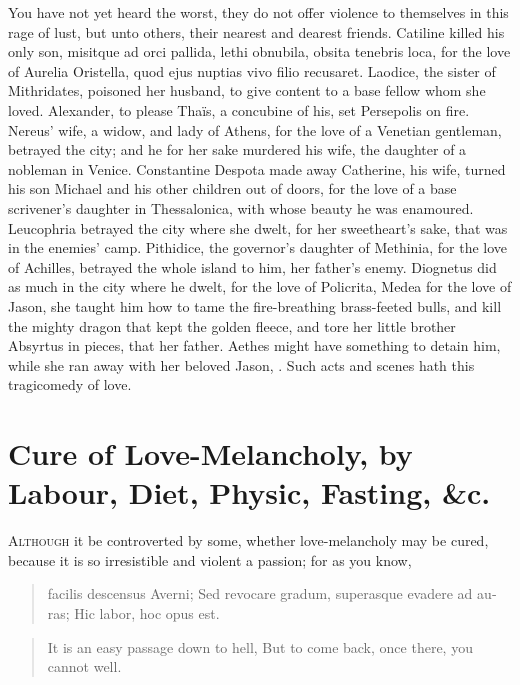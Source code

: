You have not yet heard the worst, they do not offer violence to
themselves in this rage of lust, but unto others, their nearest and
dearest friends. Catiline killed his only son, misitque ad orci
pallida, lethi obnubila, obsita tenebris loca, for the love of Aurelia
Oristella, quod ejus nuptias vivo filio recusaret. Laodice, the
sister of Mithridates, poisoned her husband, to give content to a base
fellow whom she loved. Alexander, to please Thaïs, a concubine of
his, set Persepolis on fire. Nereus' wife, a widow, and lady of
Athens, for the love of a Venetian gentleman, betrayed the city; and he
for her sake murdered his wife, the daughter of a nobleman in Venice.
Constantine Despota made away Catherine, his wife, turned his son
Michael and his other children out of doors, for the love of a base
scrivener's daughter in Thessalonica, with whose beauty he was
enamoured. Leucophria betrayed the city where she dwelt, for her
sweetheart's sake, that was in the enemies' camp. Pithidice, the
governor's daughter of Methinia, for the love of Achilles, betrayed the
whole island to him, her father's enemy. Diognetus did as much in
the city where he dwelt, for the love of Policrita, Medea for the love
of Jason, she taught him how to tame the fire-breathing brass-feeted
bulls, and kill the mighty dragon that kept the golden fleece, and tore
her little brother Absyrtus in pieces, that her father. Aethes might
have something to detain him, while she ran away with her beloved
Jason, \etc{}. Such acts and scenes hath this tragicomedy of love.


\section[Cure of Love-Melancholy]{Cure of Love-Melancholy, by Labour, Diet, Physic, Fasting, \&c.}

\lettrine{A}{lthough} it be controverted by some, whether love-melancholy may be
cured, because it is so irresistible and violent a passion; for as you
know,

\begin{latin}
\begin{verse}
facilis descensus Averni;
Sed revocare gradum, superasque evadere ad auras;
Hic labor, hoc opus est.
\end{verse}
\end{latin}
\translationrule%
\begin{verse}%
It is an easy passage down to hell,
But to come back, once there, you cannot well.
\end{verse}%

